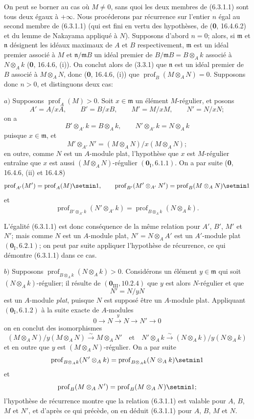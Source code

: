 On peut se borner au cas où $M\neq0$, sans quoi les deux membres de (6.3.1.1)
sont tous deux égaux à $+\infty$. Nous procéderons par récurrence sur l'entier
$n$ égal au second membre de (6.3.1.1) (qui est fini en vertu des hypothèses,
de (\textbf{0}, 16.4.6.2) et du lemme de Nakayama appliqué à $N$). Supposons d'abord
$n=0$; alors, si $\mathfrak m$ et $\mathfrak n$ désignent les idéaux maximaux
de $A$ et $B$ respectivement, $\mathfrak m$ est un idéal premier associé à $M$
et $\mathfrak n/\mathfrak mB$ un idéal premier de
$B/\mathfrak mB=B\otimes_Ak$ associé à $N\otimes_Ak$ (\textbf{0}, 16.4.6, (i)). On
conclut alors de (3.3.1) que $\mathfrak n$ est un idéal premier de $B$ associé
à $M\otimes_AN$, donc (\textbf{0}, 16.4.6, (i)) que
$\operatorname{prof}_B(M\otimes_AN)=0$. Supposons donc $n>0$, et distinguons
deux cas:

$a)$ Supposons $\operatorname{prof}_A(M)>0$. Soit $x\in\mathfrak m$ un
élément $M$-régulier, et posons
\[
A'=A/xA,\qquad B'=B/xB,\qquad M'=M/xM,\qquad N'=N/xN;
\]
on a
\[
B'\otimes_{A'}k=B\otimes_Ak,\qquad N'\otimes_{A'}k=N\otimes_Ak
\]
puisque $x\in\mathfrak m$, et
\[
M'\otimes_{A'}N'=(M\otimes_AN)/x(M\otimes_AN);
\]
en outre, comme $N$ est un $A$-module plat, l'hypothèse que $x$ est
$M$-régulier entraîne que $x$ est aussi $(M\otimes_AN)$-régulier
$(\mathbf{0}_{\mathrm I}, 6.1.1)$. On a par suite (\textbf{0}, 16.4.6, (ii) et 16.4.8)
\[
\operatorname{prof}_{A'}(M')=\operatorname{prof}_A(M)\setmin 1,
\qquad
\operatorname{prof}_{B'}(M'\otimes_{A'}N')
=\operatorname{prof}_B(M\otimes_AN)\setmin 1
\]
et
\[
\operatorname{prof}_{B'\otimes_{A'}k}(N'\otimes_{A'}k)
=\operatorname{prof}_{B\otimes_Ak}(N\otimes_Ak).
\]

L'égalité (6.3.1.1) est donc conséquence de la même relation pour $A'$,
$B'$, $M'$ et $N'$; mais comme $N$ est un $A$-module plat,
$N'=N\otimes_AA'$ est un $A'$-module plat $(\mathbf{0}_{\mathrm I}, 6.2.1)$; on peut
par suite appliquer l'hypothèse de récurrence, ce qui démontre (6.3.1.1) dans
ce cas.

$b)$ Supposons $\operatorname{prof}_{B\otimes_Ak}(N\otimes_Ak)>0$.
Considérons un élément $y\in\mathfrak m$ qui soit
$(N\otimes_Ak)$-régulier; il résulte de $(\mathbf{0}_{\mathrm{III}}, 10.2.4)$ que $y$
est alors $N$-régulier et que
\[
N'=N/yN
\]
est un $A$-module \emph{plat}, puisque $N$ est supposé être un $A$-module plat.
Appliquant $(\mathbf{0}_{\mathrm I}, 6.1.2)$ à la suite exacte de $A$-modules
\[
0\to N\xrightarrow{y}N\to N'\to0
\]
on en conclut des isomorphismes
\[
(M\otimes_AN)/y(M\otimes_AN)\xrightarrow{\sim}M\otimes_AN'
\quad\text{et}\quad
N'\otimes_Ak\xrightarrow{\sim}(N\otimes_Ak)/y(N\otimes_Ak)
\]
et en outre que $y$ est $(M\otimes_AN)$-régulier. On a par suite
\[
\operatorname{prof}_{B\otimes_Ak}(N'\otimes_Ak)
=\operatorname{prof}_{B\otimes_Ak}(N\otimes_Ak)\setmin 1
\]
et
\[
\operatorname{prof}_B(M\otimes_AN')
=\operatorname{prof}_B(M\otimes_AN)\setmin 1;
\]
l'hypothèse de récurrence montre que la relation (6.3.1.1) est valable pour
$A$, $B$, $M$ et $N'$, et d'après ce qui précède, on en déduit (6.3.1.1)
pour $A$, $B$, $M$ et $N$.

